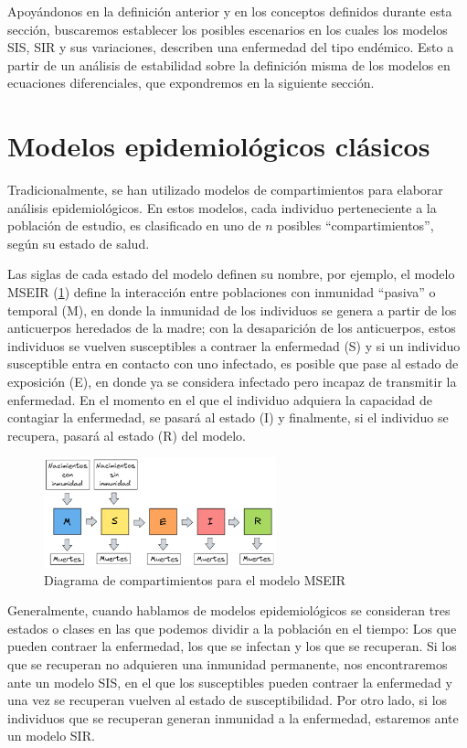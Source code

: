 Apoyándonos en la definición anterior y en los conceptos definidos durante esta sección, buscaremos establecer los posibles escenarios en los cuales los modelos SIS, SIR y sus variaciones, describen una enfermedad del tipo endémico. Esto a partir de un análisis de estabilidad sobre la definición misma de los modelos en ecuaciones diferenciales, que expondremos en la siguiente sección.

\section{Modelos epidemiológicos clásicos}\label{sec:ModelosEpidemiológicosClásicos}

Tradicionalmente, se han utilizado modelos de compartimientos para elaborar análisis epidemiológicos. En estos modelos, cada individuo perteneciente a la población de estudio, es clasificado en uno de $n$ posibles ``compartimientos'', según su estado de salud.

Las siglas de cada estado del modelo definen su nombre, por ejemplo, el modelo MSEIR (\ref{fig:MSEIR}) define la interacción entre poblaciones con inmunidad ``pasiva'' o temporal (M), en donde la inmunidad de los individuos se genera a partir de los anticuerpos heredados de la madre; con la desaparición de los anticuerpos, estos individuos se vuelven susceptibles a contraer la enfermedad (S) y si un individuo susceptible entra en contacto con uno infectado, es posible que pase al estado de exposición (E), en donde ya se considera infectado pero incapaz de transmitir la enfermedad. En el momento en el que el individuo adquiera la capacidad de contagiar la enfermedad, se pasará al estado (I) y finalmente, si el individuo se recupera, pasará al estado (R) del modelo.\cite{modelCompartimental}

\begin{figure}[h]
  \centering
    \includegraphics[width=0.6\textwidth]{Imagenes/MSEIR_compatimientos.PNG}
  \caption{Diagrama de compartimientos para el modelo MSEIR}
  \label{fig:MSEIR}
\end{figure}

Generalmente, cuando hablamos de modelos epidemiológicos se consideran tres estados o clases en las que podemos dividir a la población en el tiempo: Los que pueden contraer la enfermedad, los que se infectan y los que se recuperan. Si los que se recuperan no adquieren una inmunidad permanente, nos encontraremos ante un modelo SIS, en el que los susceptibles pueden contraer la enfermedad y una vez se recuperan vuelven al estado de susceptibilidad. Por otro lado, si los individuos que se recuperan generan inmunidad a la enfermedad, estaremos ante un modelo SIR. 

